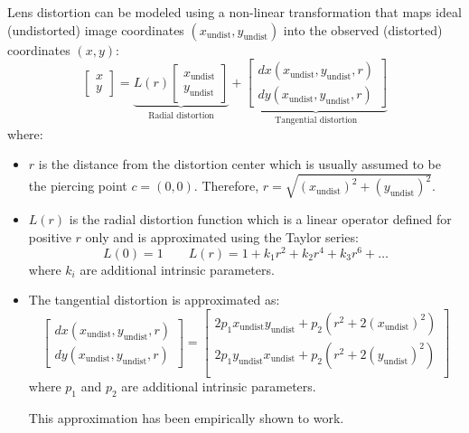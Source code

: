 Lens distortion can be modeled using a non-linear transformation that maps ideal (undistorted) image coordinates $(x_\text{undist}, y_\text{undist})$ into
the observed (distorted) coordinates $(x, y)$:
\[ 
    \begin{bmatrix} x \\ y \end{bmatrix} =
    \underbrace{ L(r) \begin{bmatrix} x_\text{undist} \\ y_\text{undist} \end{bmatrix} }_{\text{Radial distortion}} +
    \underbrace{ \begin{bmatrix} dx(x_\text{undist}, y_\text{undist}, r) \\ dy(x_\text{undist}, y_\text{undist}, r) \end{bmatrix} }_{\text{Tangential distortion}}
\]
where:
\begin{itemize}
    \item $r$ is the distance from the distortion center which is usually assumed to be the piercing point $c = (0, 0)$.
        Therefore, $r = \sqrt{ (x_\text{undist})^2 + (y_\text{undist})^2 }$.
    \item $L(r)$ is the radial distortion function which is a linear operator defined for positive $r$ only and is approximated using the Taylor series:
        \[ L(0) = 1 \hspace{2em} L(r) = 1 + k_1 r^2 + k_2 r^4 + k_3 r^6 + \dots \]
        where $k_i$ are additional intrinsic parameters.
    \item The tangential distortion is approximated as:
        \[ 
            \begin{bmatrix} dx(x_\text{undist}, y_\text{undist}, r) \\ dy(x_\text{undist}, y_\text{undist}, r) \end{bmatrix} =
            \begin{bmatrix} 
                2 p_1 x_\text{undist} y_\text{undist} + p_2 (r^2 + 2(x_\text{undist})^2) \\
                2 p_1 y_\text{undist} x_\text{undist} + p_2 (r^2 + 2(y_\text{undist})^2) \\
            \end{bmatrix}
        \]
        where $p_1$ and $p_2$ are additional intrinsic parameters.
        \begin{remark}
            This approximation has been empirically shown to work.
        \end{remark}
\end{itemize}

